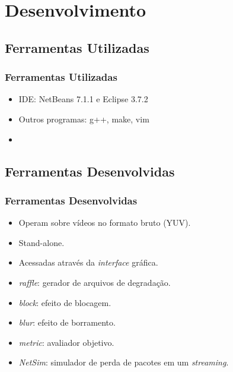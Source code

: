 \section{Desenvolvimento}

\subsection{Ferramentas Utilizadas}
    \begin{frame}\frametitle{Ferramentas Utilizadas}
        \begin{itemize}
            \item IDE: NetBeans 7.1.1 e Eclipse 3.7.2
            \item Outros programas: g++, make, vim
            \item 
        \end{itemize}
    \end{frame}
    
\subsection{Ferramentas Desenvolvidas}
    \begin{frame}\frametitle{Ferramentas Desenvolvidas}
        \begin{itemize}
            \item Operam sobre vídeos no formato bruto (YUV).
            \item Stand-alone.
            \item Acessadas através da \emph{interface} gráfica.
        \end{itemize}
        \begin{itemize}
            \item \emph{raffle}: gerador de arquivos de degradação.
            \item \emph{block}: efeito de blocagem.
            \item \emph{blur}: efeito de borramento.
            \item \emph{metric}: avaliador objetivo.
            \item \emph{NetSim}: simulador de perda de pacotes em um \emph{streaming}.
        \end{itemize}
    \end{frame}
    
